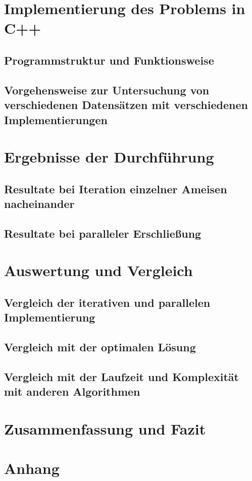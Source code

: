 \documentclass[doktyp=barbeit, sprache=german]{TUBAFarbeiten}
\begin{document}
\section{Implementierung des Problems in C++}
\subsection{Programmstruktur und Funktionsweise}
\subsection{Vorgehensweise zur Untersuchung von verschiedenen Datensätzen mit verschiedenen Implementierungen}
\section{Ergebnisse der Durchführung}
\subsection{Resultate bei Iteration einzelner Ameisen nacheinander}
\subsection{Resultate bei paralleler Erschließung}
\section{Auswertung und Vergleich}
\subsection{Vergleich der iterativen und parallelen Implementierung}
\subsection{Vergleich mit der optimalen Lösung}
\subsection{Vergleich mit der Laufzeit und Komplexität mit anderen Algorithmen}
\section{Zusammenfassung und Fazit}
\section{Anhang}
\newpage
{}
\end{document}
